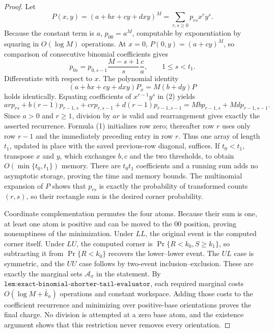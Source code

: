 \documentclass{article}
\begin{document}
\begin{proof}
Let
\[
P(x,y)=(a+bx+cy+dxy)^M=\sum_{r,s\ge0}p_{rs}x^ry^s.
\]
Because the constant term is \(a\), \(p_{00}=a^M\), computable by exponentiation by squaring in \(O(\log M)\) operations. At \(x=0\), \(P(0,y)=(a+cy)^M\), so comparison of consecutive binomial coefficients gives
\[
p_{0s}=p_{0,s-1}\frac{M-s+1}{s}\frac ca,\qquad 1\le s<t_1.
\tag{1}
\]
Differentiate with respect to \(x\). The polynomial identity
\[
(a+bx+cy+dxy)P_x=M(b+dy)P
\tag{2}
\]
holds identically. Equating coefficients of \(x^{r-1}y^s\) in (2) yields
\[
ar p_{rs}+b(r-1)p_{r-1,s}+crp_{r,s-1}+d(r-1)p_{r-1,s-1}
=Mb p_{r-1,s}+Md p_{r-1,s-1}.
\]
Since \(a>0\) and \(r\ge1\), division by \(ar\) is valid and rearrangement gives exactly the asserted recurrence. Formula (1) initializes row zero; thereafter row \(r\) uses only row \(r-1\) and the immediately preceding entry in row \(r\). Thus one array of length \(t_1\), updated in place with the saved previous-row diagonal, suffices. If \(t_0<t_1\), transpose \(x\) and \(y\), which exchanges \(b,c\) and the two thresholds, to obtain \(O(\min\{t_0,t_1\})\) memory. There are \(t_0t_1\) coefficients and a running sum adds no asymptotic storage, proving the time and memory bounds. The multinomial expansion of \(P\) shows that \(p_{rs}\) is exactly the probability of transformed counts \((r,s)\), so their rectangle sum is the desired corner probability.

Coordinate complementation permutes the four atoms. Because their sum is one, at least one atom is positive and can be moved to the \(00\) position, proving nonemptiness of the minimization. Under \(LL\), the original event is the computed corner itself. Under \(LU\), the computed corner is \(\Pr\{R<k_0,S\ge k_1\}\), so subtracting it from \(\Pr\{R<k_0\}\) recovers the lower--lower event. The \(UL\) case is symmetric, and the \(UU\) case follows by two-event inclusion--exclusion. These are exactly the marginal sets \(\mathcal A_\sigma\) in the statement. By \(\texttt{lem:exact-binomial-shorter-tail-evaluator}\), each required marginal costs \(O(\log M+\bar k_a)\) operations and constant workspace. Adding those costs to the coefficient recurrence and minimizing over positive-base orientations proves the final charge. No division is attempted at a zero base atom, and the existence argument shows that this restriction never removes every orientation.
\end{proof}
\end{document}
